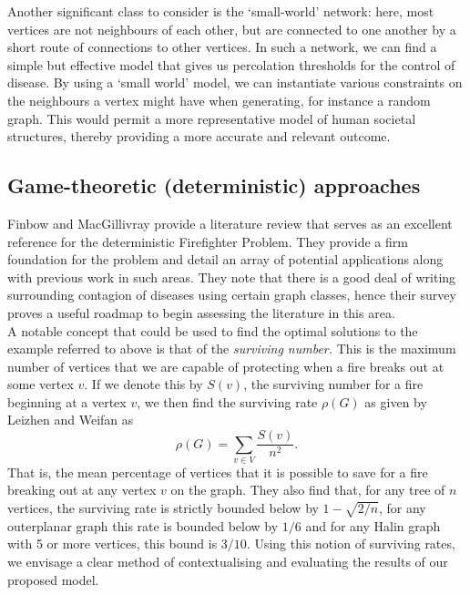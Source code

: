 \documentclass[hidelinks,a4paper,11pt]{article}
\numberwithin{equation}{section}
\begin{document}
Another significant class to consider is the `small-world' network: here, most vertices are not neighbours of each other, but are connected to one another by a short route of connections to other vertices. \cite{porter12} In such a network, we can find a simple but effective model that gives us percolation thresholds for the control of disease. \cite{newman02} By using a `small world' model, we can instantiate various constraints on the neighbours a vertex might have when generating, for instance a random graph. This would permit a more representative model of human societal structures, thereby providing a more accurate and relevant outcome.


\subsection{Game-theoretic (deterministic) approaches}

Finbow and MacGillivray provide a literature review that serves as an excellent reference for the deterministic Firefighter Problem.\cite{finbow09} They provide a firm foundation for the problem and detail an array of potential applications along with previous work in such areas. They note that there is a good deal of writing surrounding contagion of diseases using certain graph classes, hence their survey proves a useful roadmap to begin assessing the literature in this area.\\

A notable concept that could be used to find the optimal solutions to the example referred to above is that of the {\it surviving number.} This is the maximum number of vertices that we are capable of protecting when a fire breaks out at some vertex $v$. If we denote this by $S(v)$, the surviving number for a fire beginning at a vertex $v$, we then find the surviving rate $\rho(G)$ as given by Leizhen and Weifan \cite{leizhen09} as $$\displaystyle\rho(G)=\sum_{v\in V}\frac{S(v)}{n^2}.$$That is, the mean percentage of vertices that it is possible to save for a fire breaking out at any vertex $v$ on the graph. They also find that, for any tree of $n$ vertices, the surviving rate is strictly bounded below by $1-\sqrt{2/n}$, for any outerplanar graph this rate is bounded below by ${1}/{6}$ and for any Halin graph with 5 or more vertices, this bound is ${3}/{10}.$\cite{leizhen09} Using this notion of surviving rates, we envisage a clear method of contextualising and evaluating the results of our proposed model.\\
\end{document}
